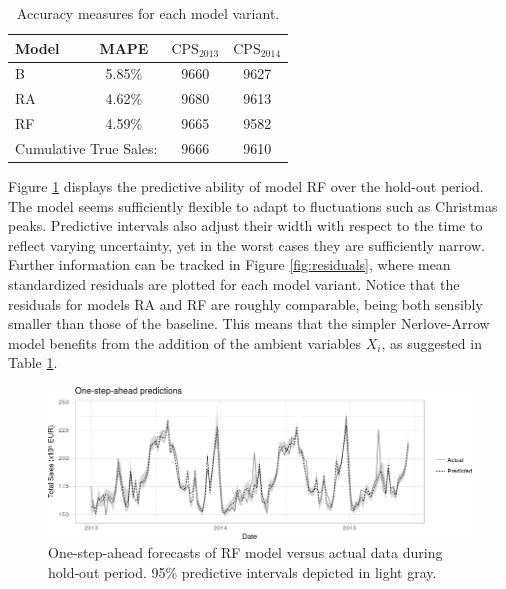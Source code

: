 \begin{table}[h]
\centering
\begin{tabular}{|l|c|c|c|}
\hline
Model & MAPE & $\text{CPS}_{2013}$ & $\text{CPS}_{2014}$ \\
\hline
B &  5.85\% &   9660 & 9627 \\
RA &  4.62\% &  9680 & 9613 \\
RF &  4.59\% &  9665 & 9582 \\
\hline
\multicolumn{2}{|c|}{Cumulative True Sales:} & 9666 & 9610 \\
\hline
\end{tabular}
\caption{Accuracy measures for each model variant.} \label{tab:mapes}
\end{table}



Figure \ref{fig:forecasts} displays the predictive ability of model RF over the hold-out period. The model seems sufficiently flexible to adapt to fluctuations such as Christmas peaks. Predictive intervals also adjust their width with respect to the time to reflect varying uncertainty, yet in the worst cases they are sufficiently narrow. Further information can be tracked in Figure \ref{fig:residuals}, where mean standardized residuals are plotted for each model variant. Notice that the residuals for models RA and RF are roughly comparable, being both sensibly smaller than those of the baseline. This means that the simpler Nerlove-Arrow model benefits from the addition of the ambient variables $X_i$, as suggested in  Table \ref{tab:mapes}.
\begin{figure}[h]
\centering
\includegraphics[scale=0.55]{figures/forecasts.png}
\caption{One-step-ahead forecasts of  RF model versus actual data during hold-out period. 95\% predictive intervals depicted in light gray.}\label{fig:forecasts}
\end{figure}



